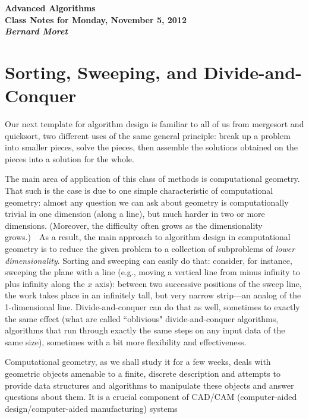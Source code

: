 \documentclass[11pt]{article}
\begin{document}
\begin{center}
  \LARGE\bf Advanced Algorithms\\

  \Large\sf
  Class Notes for Monday, November 5, 2012\\

  \it
  Bernard Moret
\end{center}

\bigskip


\section{Sorting, Sweeping, and Divide-and-Conquer}
Our next template for algorithm design is familiar to all of us from
mergesort and quicksort, two different uses of the same general
principle: break up a problem into smaller pieces, solve the
pieces, then assemble the solutions obtained on the pieces into
a solution for the whole.

The main area of application of this class of methods is computational
geometry.   That such is the case is due to one simple characteristic
of computational geometry: almost any question we can ask about
geometry is computationally trivial in one dimension (along a line),
but much harder in two or more dimensions.  (Moreover, the difficulty
often grows as the dimensionality grows.)\ \ As a result, the main approach
to algorithm design in computational geometry is to reduce the given
problem to a collection of subproblems of \emph{lower dimensionality}.
Sorting and sweeping can easily do that: consider, for instance, sweeping
the plane with a line (e.g., moving a vertical line from minus infinity to
plus infinity along the $x$ axis): between two successive positions
of the sweep line, the work takes place in an infinitely tall, but very
narrow strip---an analog of the 1-dimensional line.  Divide-and-conquer
can do that as well, sometimes to exactly the same effect (what are
called ``oblivious" divide-and-conquer algorithms, algorithms that run
through exactly the same steps on any input data of the same size), sometimes
with a bit more flexibility and effectiveness.

Computational geometry, as we shall study it for a few weeks, deals
with geometric objects amenable to a finite, discrete description
and attempts to provide data structures and algorithms to manipulate
these objects and answer questions about them.  It is a crucial
component of CAD/CAM (computer-aided design/computer-aided manufacturing)
systems
\end{document}
